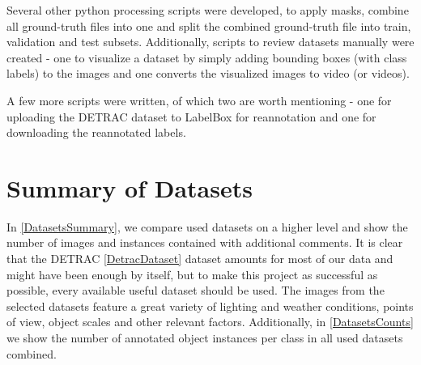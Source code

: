 Several other python processing scripts were developed, to apply masks, combine
all ground-truth files into one and split the combined ground-truth file into
train, validation and test subsets. Additionally, scripts to review datasets
manually were created - one to visualize a dataset by simply adding bounding
boxes (with class labels) to the images and one converts the visualized images
to video (or videos).

A few more scripts were written, of which two are worth mentioning - one for
uploading the DETRAC dataset to LabelBox for reannotation and one for
downloading the reannotated labels.


\section{Summary of Datasets}

In \autoref{DatasetsSummary}, we compare used datasets on a higher level and
show the number of images and instances contained with additional comments. It
is clear that the DETRAC \autoref{DetracDataset} dataset amounts for most of our
data and might have been enough by itself, but to make this project as
successful as possible, every available useful dataset should be used. The
images from the selected datasets feature a great variety of lighting and
weather conditions, points of view, object scales and other relevant factors.
Additionally, in \autoref{DatasetsCounts} we show the number of annotated object
instances per class in all used datasets combined. 


